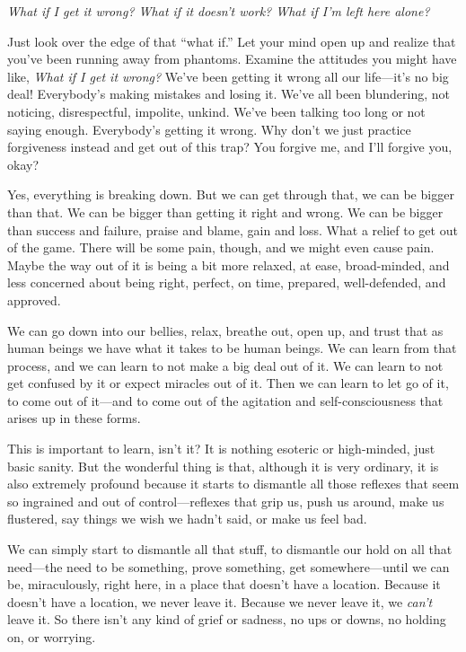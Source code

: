 
\emph{What if I get it wrong? What if it doesn't work? What if I'm left 
here alone?}

Just look over the edge of that ``what if.'' Let your mind open up and 
realize that you've been running away from phantoms. Examine the 
attitudes you might have like, \emph{What if I get it wrong?} We've 
been getting it wrong all our life---it's no big deal! Everybody's 
making mistakes and losing it. We've all been blundering, not noticing, 
disrespectful, impolite, unkind. We've been talking too long or not 
saying enough. Everybody's getting it wrong. Why don't we just practice 
forgiveness instead and get out of this trap? You forgive me, and I'll 
forgive you, okay?

Yes, everything is breaking down. But we can get through that, we can 
be bigger than that. We can be bigger than getting it right and wrong. 
We can be bigger than success and failure, praise and blame, gain and 
loss. What a relief to get out of the game. There will be some pain, 
though, and we might even cause pain. Maybe the way out of it is being 
a bit more relaxed, at ease, broad-minded, and less concerned about 
being right, perfect, on time, prepared, well-defended, and approved.

We can go down into our bellies, relax, breathe out, open up, and trust 
that as human beings we have what it takes to be human beings. We can 
learn from that process, and we can learn to not make a big deal out of 
it. We can learn to not get confused by it or expect miracles out of 
it. Then we can learn to let go of it, to come out of it---and to come 
out of the agitation and self-consciousness that arises up in these 
forms.

This is important to learn, isn't it? It is nothing esoteric or 
high-minded, just basic sanity. But the wonderful thing is that, 
although it is very ordinary, it is also extremely profound because it 
starts to dismantle all those reflexes that seem so ingrained and out 
of control---reflexes that grip us, push us around, make us flustered, 
say things we wish we hadn't said, or make us feel bad.

We can simply start to dismantle all that stuff, to dismantle our hold 
on all that need---the need to be something, prove something, get 
somewhere---until we can be, miraculously, right here, in a place that 
doesn't have a location. Because it doesn't have a location, we never 
leave it. Because we never leave it, we \emph{can't} leave it. So there 
isn't any kind of grief or sadness, no ups or downs, no holding on, or 
worrying.

